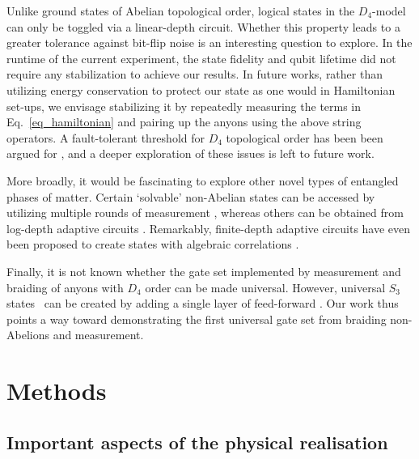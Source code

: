 \documentclass[nofootinbib,pra,twocolumn,showpacs,superscriptaddress,notitlepage,amsmath]{revtex4-2} %
\begin{document}
Unlike ground states of Abelian topological order, logical states in the $D_4$-model can only be toggled via a linear-depth circuit. Whether this property leads to a greater tolerance against bit-flip noise is an interesting question to explore. In the runtime of the current experiment, the state fidelity and qubit lifetime did not require any stabilization to achieve our results. In future works, rather than utilizing energy conservation to protect our state as one would in Hamiltonian set-ups,  we envisage stabilizing it by repeatedly measuring the terms in Eq.~\eqref{eq_hamiltonian} and pairing up the anyons using the above string operators. A fault-tolerant threshold for $D_4$ topological order has been  been argued for \cite{Dauphinais2017}, and a deeper exploration of these issues is left to future work.

More broadly, it would be fascinating to explore other novel types of entangled phases of matter. Certain `solvable' non-Abelian states can be accessed by utilizing multiple rounds of measurement \cite{measureSPT,verresen2022efficiently,tantivasadakarn_hierarchy_2022,Bravyi22}, whereas others can be obtained from log-depth adaptive circuits \cite{Hsieh22}. Remarkably, finite-depth adaptive circuits have even been proposed to create states with algebraic correlations \cite{Zhu22,Lee22,Lu23}.

Finally, it is not known whether the gate set implemented by measurement and braiding of anyons with $D_4$ order can be made universal. However, universal $S_3$ states~\cite{mochon_anyon_2004, cui_universal_2015} can be created by adding a single layer of feed-forward \cite{tantivasadakarn_hierarchy_2022}. Our work thus points a way toward demonstrating the first universal gate set from braiding non-Abelions and measurement.


%
%





\onecolumngrid
\newpage

\appendix

\section{Methods}

\subsection{Important aspects of the physical realisation}
\label{methods_hardware}
\end{document}
